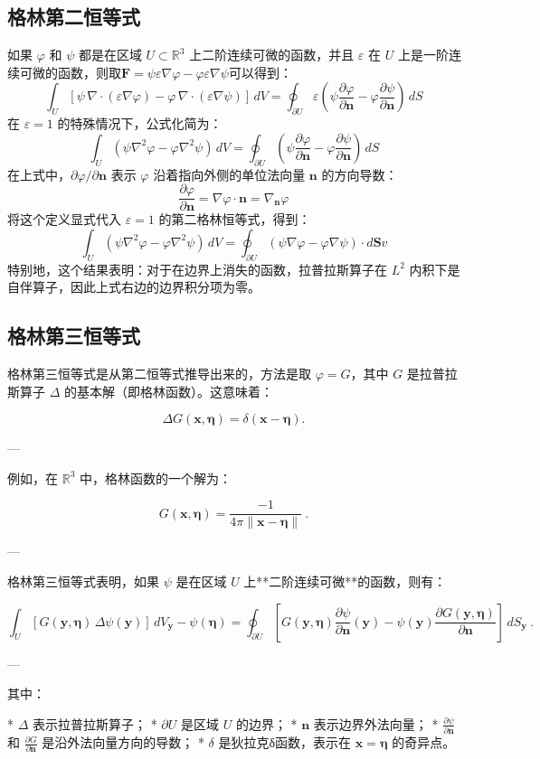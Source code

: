 \subsection{格林第二恒等式}
如果 $\varphi$ 和 $\psi$ 都是在区域 $U \subset \mathbb{R}^3$ 上二阶连续可微的函数，并且 $\varepsilon$ 在 $U$ 上是一阶连续可微的函数，则取$\mathbf{F} = \psi \varepsilon \nabla \varphi - \varphi \varepsilon \nabla \psi$可以得到：
$$
\int_U \left[\psi \,\nabla \cdot (\varepsilon \nabla \varphi) - \varphi \,\nabla \cdot (\varepsilon \nabla \psi)\right]\, dV
=
\oint_{\partial U} \varepsilon \left(\psi \frac{\partial \varphi}{\partial \mathbf{n}} - \varphi \frac{\partial \psi}{\partial \mathbf{n}}\right)\, dS~
$$
在 $\varepsilon = 1$ 的特殊情况下，公式化简为：
$$
\int_U \left(\psi \nabla^2 \varphi - \varphi \nabla^2 \psi\right) \, dV
=
\oint_{\partial U} \left(\psi \frac{\partial \varphi}{\partial \mathbf{n}} - \varphi \frac{\partial \psi}{\partial \mathbf{n}}\right) \, dS~
$$
在上式中，$\displaystyle \partial \varphi/\partial \mathbf{n}$ 表示 $\varphi$ 沿着指向外侧的单位法向量 $\mathbf{n}$ 的方向导数：
$$
\frac{\partial \varphi}{\partial \mathbf{n}}
= \nabla \varphi \cdot \mathbf{n}
= \nabla_{\mathbf{n}} \varphi~
$$
将这个定义显式代入 $\varepsilon = 1$ 的第二格林恒等式，得到：
$$
\int_U \left(\psi \nabla^2 \varphi - \varphi \nabla^2 \psi\right) \, dV
=
\oint_{\partial U} \left(\psi \nabla \varphi - \varphi \nabla \psi\right) \cdot d\mathbf{S}v~
$$
特别地，这个结果表明：对于在边界上消失的函数，拉普拉斯算子在 $L^2$ 内积下是自伴算子，因此上式右边的边界积分项为零。
\subsection{格林第三恒等式}
格林第三恒等式是从第二恒等式推导出来的，方法是取 $\varphi = G$，其中 $G$ 是拉普拉斯算子 $\Delta$ 的基本解（即格林函数）。这意味着：

$$
\Delta G(\mathbf{x}, \boldsymbol{\eta}) = \delta(\mathbf{x} - \boldsymbol{\eta}).~
$$

---

例如，在 $\mathbb{R}^3$ 中，格林函数的一个解为：

$$
G(\mathbf{x}, \boldsymbol{\eta}) = \frac{-1}{4\pi \|\mathbf{x} - \boldsymbol{\eta}\|} ~.~
$$

---

格林第三恒等式表明，如果 $\psi$ 是在区域 $U$ 上**二阶连续可微**的函数，则有：

$$
\int_{U} \left[ G(\mathbf{y}, \boldsymbol{\eta}) \, \Delta \psi(\mathbf{y}) \right] \, dV_{\mathbf{y}}
- \psi(\boldsymbol{\eta})
=
\oint_{\partial U} 
\left[
G(\mathbf{y}, \boldsymbol{\eta}) 
\frac{\partial \psi}{\partial \mathbf{n}} (\mathbf{y})
-
\psi(\mathbf{y})
\frac{\partial G(\mathbf{y}, \boldsymbol{\eta})}{\partial \mathbf{n}}
\right] 
\, dS_{\mathbf{y}} ~.
$$

---

其中：

* $\Delta$ 表示拉普拉斯算子；
* $\partial U$ 是区域 $U$ 的边界；
* $\mathbf{n}$ 表示边界外法向量；
* $\displaystyle \frac{\partial \psi}{\partial \mathbf{n}}$ 和 $\displaystyle \frac{\partial G}{\partial \mathbf{n}}$ 是沿外法向量方向的导数；
* $\delta$ 是狄拉克δ函数，表示在 $\mathbf{x} = \boldsymbol{\eta}$ 的奇异点。
